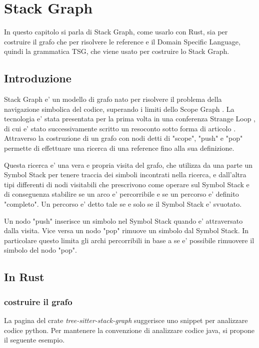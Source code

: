 \chapter{Stack Graph}

In questo capitolo si parla di Stack Graph, come usarlo con Rust, sia per costruire il grafo che per risolvere le reference e il Domain Specific Language, quindi la grammatica TSG, che viene usato per costruire lo Stack Graph.

\section{Introduzione}

Stack Graph \cite{StackGraph} e' un modello di grafo nato per risolvere il problema della navigazione simbolica del codice, superando i limiti dello Scope Graph \cite{ScopeGraph}.
La tecnologia e' stata presentata per la prima volta in una conferenza Strange Loop \cite{StackGraphConference}, di cui e' stato successivamente scritto un resoconto sotto forma di articolo \cite{StackGraphIntro}.
Attraverso la costruzione di un grafo con nodi detti di "scope", "push" e "pop" permette di effettuare una ricerca di una reference fino alla sua definizione.

Questa ricerca e' una vera e propria visita del grafo, che utilizza da una parte un Symbol Stack per tenere traccia dei simboli incontrati nella ricerca, e dall'altra tipi differenti di nodi visitabili che prescrivono come operare sul Symbol Stack e di conseguenza stabilire se un arco e' percorribile e se un percorso e' definito "completo".
Un percorso e' detto tale se e solo se il Symbol Stack e' svuotato.

Un nodo "push" inserisce un simbolo nel Symbol Stack quando e' attraversato dalla visita.
Vice versa un nodo "pop" rimuove un simbolo dal Symbol Stack.
In particolare questo limita gli archi percorribili in base a se e' possibile rimuovere il simbolo del nodo "pop".

\section{In Rust}

\subsection{costruire il grafo}

La pagina del crate \emph{tree-sitter-stack-graph} \cite{TreeSitterStackGraph} suggerisce uno snippet per analizzare codice python.
Per mantenere la convenzione di analizzare codice java, si propone il seguente esempio.

